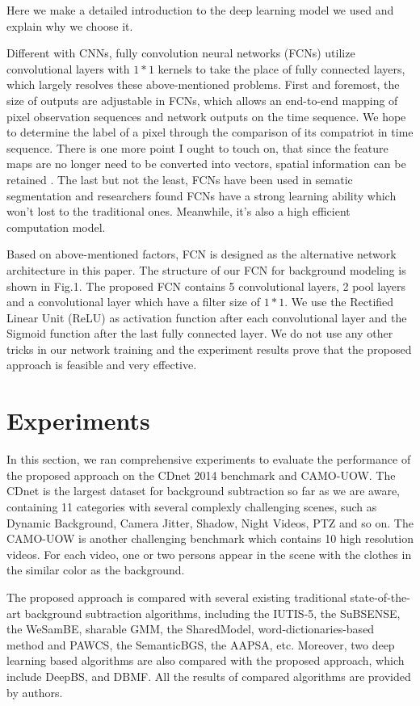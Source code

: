 \documentclass[journal]{IEEEtran}
\begin{document}
Here we make a detailed introduction to the deep learning model we used and explain why we choose it.

Different with CNNs, fully convolution neural networks (FCNs) utilize convolutional layers with $1*1$ kernels to take the place of fully connected layers, which largely resolves these above-mentioned problems. 
First and foremost, the size of outputs are adjustable in FCNs, which allows an end-to-end mapping of pixel observation sequences and network outputs on the time sequence. 
We hope to determine the label of a pixel through the comparison of its compatriot in time sequence. 
There is one more point I ought to touch on, that since the feature maps are no longer need to be converted into vectors, spatial information can be retained . 
The last but not the least, FCNs have been used in sematic segmentation and researchers found FCNs have a strong learning ability which won’t lost to the traditional ones. 
Meanwhile, it’s also a high efficient computation model. 


Based on above-mentioned factors, FCN is designed as the alternative network architecture in this paper. 
The structure of our FCN for background modeling is shown in Fig.1. 
The proposed FCN contains 5 convolutional layers, 2 pool layers and a convolutional layer which have a filter size of $1*1$. 
We use the Rectified Linear Unit (ReLU) as activation function after each convolutional layer and the Sigmoid function after the last fully connected layer. 
We do not use any other tricks in our network training and the experiment results prove that the proposed approach is feasible and very effective.


\section{Experiments}

In this section, we ran comprehensive experiments to evaluate the performance of the proposed approach on the CDnet 2014 benchmark and CAMO-UOW. 
The CDnet is the largest dataset for background subtraction so far as we are aware, containing 11 categories with several complexly challenging scenes, such as Dynamic Background, Camera Jitter, Shadow, Night Videos, PTZ and so on. 
The CAMO-UOW is another challenging benchmark which contains 10 high resolution videos. 
For each video, one or two persons appear in the scene with the clothes in the similar color as the background.

The proposed approach is compared with several existing traditional state-of-the-art background subtraction algorithms, including the IUTIS-5, the SuBSENSE, the WeSamBE, sharable GMM, the SharedModel, word-dictionaries-based method and PAWCS, the SemanticBGS, the AAPSA, etc. 
Moreover, two deep learning based algorithms are also compared with the proposed approach, which include DeepBS, and DBMF. 
All the results of compared algorithms are provided by authors.
\end{document}
